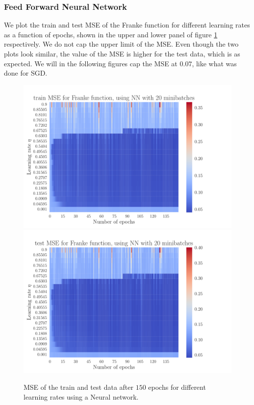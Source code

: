 \documentclass[12pt]{extarticle}
\begin{document}
\subsubsection{Feed Forward Neural Network}

We plot the train and test MSE of the Franke function for different learning rates as a function of epochs, shown in the upper and lower panel of figure \ref{fig:NN_Franke_epochs_eta_MSE} respectively. We do not cap the upper limit of the MSE. Even though the two plots look similar, the value of the MSE is higher for the test data, which is as expected. We will in the following figures cap the MSE at $0.07$, like what was done for SGD.

\begin{figure}[h!]
	\includegraphics[width=\linewidth]{NN_Franke/NN_Franke__epochs_eta__train_MSE__569887.pdf}
	\includegraphics[width=\linewidth]{NN_Franke/NN_Franke__epochs_eta__test_MSE__271070.pdf}
	\caption{MSE of the train and test data after $150$ epochs for different learning rates using a Neural network.}
	\label{fig:NN_Franke_epochs_eta_MSE}
\end{figure}
\end{document}
